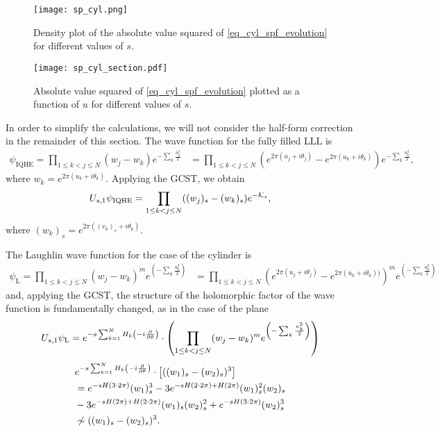 \documentclass[notas.tex]{subfiles}
\begin{document}
\begin{figure}[htbp]
	\centering
	\texttt{[image: sp\_cyl.png]}
	\caption{Density plot of the absolute value squared of \eqref{eq_cyl_spf_evolution} for different values of $s$.}
	\label{fig_spf_cyl_evolution}
\end{figure}
\begin{figure}[htbp]
	\centering
	\texttt{[image: sp\_cyl\_section.pdf]}
	\caption{Absolute value squared of \eqref{eq_cyl_spf_evolution} plotted as a function of $u$ for different values of $s$.}
	\label{fig_spf_cyl_evolution_sec}
\end{figure}
In order to simplify the calculations, we will not consider the half-form correction in the remainder of this section. The wave function for the fully filled LLL is
\begin{align*}
	\psi_\text{IQHE} = \prod_{1 \leq k < j \leq N}(w_j-w_k) e^{-\sum_{k}\frac{u_k^2}{2}} &= \prod_{1 \leq k < j \leq N}\left(e^{2\pi (u_j + i \theta_j)}-e^{2\pi (u_k + i \theta_k)}\right) e^{-\sum_{k}\frac{u_k^2}{2}},
\end{align*}
where $w_k = e^{2\pi (u_k+i\theta_k)}$. Applying the GCST, we obtain
\begin{align} \label{eq_cyl_iqh_evolution}
	U_{s,1} \psi_\text{IQHE} = \prod_{1 \leq k < j \leq N}((w_j)_s-(w_k)_s) e^{-\mathcal{K}_s},
\end{align}
where $(w_k)_s = e^{2\pi \left ((v_k)_s + i \theta_k \right )}$. 

The Laughlin wave function for the case of the cylinder is
\begin{align} \label{eq_laughlin_cyl}
	\psi_\text{L} = \prod_{1 \leq k < j \leq N}(w_j-w_k)^m e^{\left( -\sum_{k}\frac{u_k^2}{2}\right)} &= \prod_{1 \leq k < j \leq N}\left(e^{2\pi (u_j + i \theta_j)}-e^{2\pi (u_k + i \theta_k))}\right)^m e^{\left( -\sum_{k}\frac{u_k^2}{2}\right)}
\end{align}
and, applying the GCST, the structure of the holomorphic factor of the wave function is fundamentally changed, as in the case of the plane 
\begin{align*}
	U_{s,1} \psi_\text{L} = e^{- s \sum_{k=1}^{N} H_k \left (- i \frac{\partial }{\partial \theta} \right )} \cdot \left ( \prod_{1 \leq k < j \leq N}(w_j-w_k)^m e^{\left( -\sum_{k}\frac{u_k^2}{2}\right)} \right )
\end{align*}
\begin{align}
	&e^{- s \sum_{k=1}^{N} H_k \left (- i \frac{\partial }{\partial \theta} \right )} \cdot \left [ ((w_1)_{s} - (w_2)_{s})^3 \right ] \nonumber \\
	&=  e^{-s H \left (3 \cdot 2 \pi \right )} (w_1)_{s}^3 - 3  e^{-s H \left (2 \cdot 2 \pi \right ) + H \left (2 \pi \right )} (w_1)^2_{s}(w_2)_{s} \label{eq_prefactor_change_cyl}\\ 
	&- 3 e^{-s H \left (2 \pi \right ) + H \left (2 \cdot 2 \pi \right )} (w_1)_{s}(w_2)^2_{s} + e^{-s H \left (3 \cdot 2 \pi \right )} (w_2)_{s}^3 \nonumber \\
	&\not\sim ((w_1)_{s} - (w_2)_{s})^3. \nonumber
\end{align}
\end{document}
